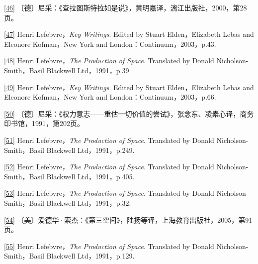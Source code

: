 \documentclass[UTF8, fontset = sourcesans, a4paper, oneside, zihao =
-4, scheme=chinese, no-math, space=true]{ctexbook}
\begin{document}
\protect\hypertarget{part0005_split_003.htmlux5cux23m46}{}{}\protect\hyperlink{part0005_split_003.htmlux5cux23w46}{{[}46{]}}
〔德〕尼采：《查拉图斯特拉如是说》，黄明嘉译，漓江出版社，2000，第28页。

\protect\hypertarget{part0005_split_003.htmlux5cux23m47}{}{}\protect\hyperlink{part0005_split_003.htmlux5cux23w47}{{[}47{]}}
Henri Lefebvre，\emph{Key Writings}. Edited by Stuart Elden，Elizabeth
Lebas and Eleonore Kofman，New York and London：Continuum，2003，p.43.

\protect\hypertarget{part0005_split_003.htmlux5cux23m48}{}{}\protect\hyperlink{part0005_split_003.htmlux5cux23w48}{{[}48{]}}
Henri Lefebvre，\emph{The Production of Space}. Translated by Donald
Nicholson-Smith，Basil Blackwell Ltd，1991，p.39.

\protect\hypertarget{part0005_split_003.htmlux5cux23m49}{}{}\protect\hyperlink{part0005_split_003.htmlux5cux23w49}{{[}49{]}}
Henri Lefebvre，\emph{Key Writings}. Edited by Stuart Elden，Elizabeth
Lebas and Eleonore Kofman，New York and London：Continuum，2003，p.66.

\protect\hypertarget{part0005_split_003.htmlux5cux23m50}{}{}\protect\hyperlink{part0005_split_003.htmlux5cux23w50}{{[}50{]}}
〔德〕尼采：《权力意志------重估一切价值的尝试》，张念东、凌素心译，商务印书馆，1991，第202页。

\protect\hypertarget{part0005_split_003.htmlux5cux23m51}{}{}\protect\hyperlink{part0005_split_003.htmlux5cux23w51}{{[}51{]}}
Henri Lefebvre，\emph{The Production of Space}. Translated by Donald
Nicholson-Smith，Basil Blackwell Ltd，1991，p.249.

\protect\hypertarget{part0005_split_003.htmlux5cux23m52}{}{}\protect\hyperlink{part0005_split_003.htmlux5cux23w52}{{[}52{]}}
Henri Lefebvre，\emph{The Production of Space}. Translated by Donald
Nicholson-Smith，Basil Blackwell Ltd，1991，p.405.

\protect\hypertarget{part0005_split_003.htmlux5cux23m53}{}{}\protect\hyperlink{part0005_split_003.htmlux5cux23w53}{{[}53{]}}
Henri Lefebvre，\emph{The Production of Space}. Translated by Donald
Nicholson-Smith，Basil Blackwell Ltd，1991，p.32.

\protect\hypertarget{part0005_split_003.htmlux5cux23m54}{}{}\protect\hyperlink{part0005_split_003.htmlux5cux23w54}{{[}54{]}}
〔美〕爱德华·索杰：《第三空间》，陆扬等译，上海教育出版社，2005，第91页。

\protect\hypertarget{part0005_split_003.htmlux5cux23m55}{}{}\protect\hyperlink{part0005_split_003.htmlux5cux23w55}{{[}55{]}}
Henri Lefebvre，\emph{The Production of Space}. Translated by Donald
Nicholson-Smith，Basil Blackwell Ltd，1991，p.129.
\end{document}
